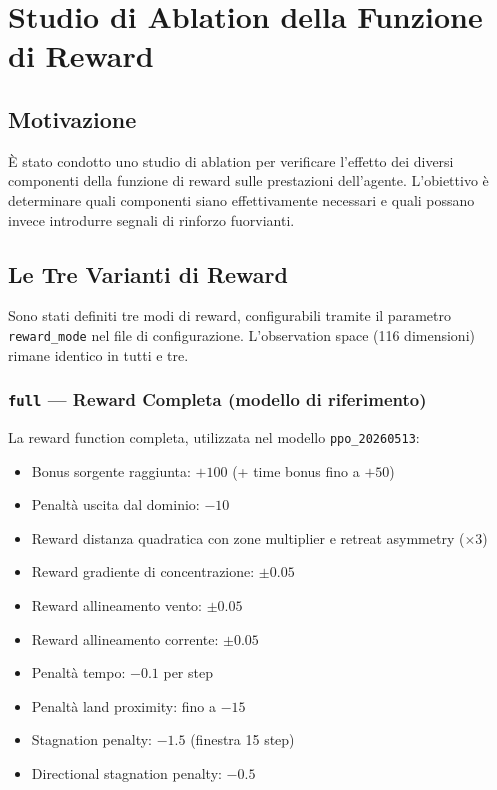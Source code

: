 \documentclass[12pt, a4paper]{article}
\begin{document}
\section{Studio di Ablation della Funzione di Reward}

\subsection{Motivazione}

\`E stato condotto uno studio di ablation per verificare
l'effetto dei diversi componenti della funzione di reward sulle prestazioni dell'agente.
L'obiettivo \`e determinare quali componenti siano effettivamente necessari e quali
possano invece introdurre segnali di rinforzo fuorvianti.

\subsection{Le Tre Varianti di Reward}

Sono stati definiti tre modi di reward, configurabili tramite il parametro \texttt{reward\_mode}
nel file di configurazione. L'observation space (116 dimensioni) rimane identico in tutti e tre.

\subsubsection*{\texttt{full} --- Reward Completa (modello di riferimento)}

La reward function completa, utilizzata nel modello \texttt{ppo\_20260513}:

\begin{itemize}
    \item Bonus sorgente raggiunta: $+100$ (+ time bonus fino a $+50$)
    \item Penalt\`a uscita dal dominio: $-10$
    \item Reward distanza quadratica con zone multiplier e retreat asymmetry ($\times 3$)
    \item Reward gradiente di concentrazione: $\pm 0.05$
    \item Reward allineamento vento: $\pm 0.05$
    \item Reward allineamento corrente: $\pm 0.05$
    \item Penalt\`a tempo: $-0.1$ per step
    \item Penalt\`a land proximity: fino a $-15$
    \item Stagnation penalty: $-1.5$ (finestra 15 step)
    \item Directional stagnation penalty: $-0.5$
\end{itemize}
\end{document}

